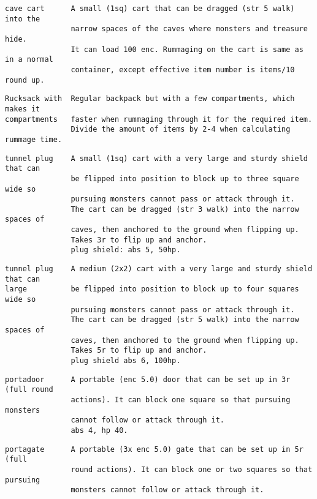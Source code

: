 \small \begin{samepage} \begin{verbatim}
cave cart      A small (1sq) cart that can be dragged (str 5 walk) into the
               narrow spaces of the caves where monsters and treasure hide.
               It can load 100 enc. Rummaging on the cart is same as in a normal
               container, except effective item number is items/10 round up.
\end{verbatim} \blocklistgap \begin{verbatim}
Rucksack with  Regular backpack but with a few compartments, which makes it
compartments   faster when rummaging through it for the required item.
               Divide the amount of items by 2-4 when calculating rummage time.
\end{verbatim} \blocklistgap \begin{verbatim}
tunnel plug    A small (1sq) cart with a very large and sturdy shield that can
               be flipped into position to block up to three square wide so
               pursuing monsters cannot pass or attack through it.
               The cart can be dragged (str 3 walk) into the narrow spaces of
               caves, then anchored to the ground when flipping up.
               Takes 3r to flip up and anchor.
               plug shield: abs 5, 50hp.
\end{verbatim} \blocklistgap \begin{verbatim}
tunnel plug    A medium (2x2) cart with a very large and sturdy shield that can
large          be flipped into position to block up to four squares wide so
               pursuing monsters cannot pass or attack through it.
               The cart can be dragged (str 5 walk) into the narrow spaces of
               caves, then anchored to the ground when flipping up.
               Takes 5r to flip up and anchor.
               plug shield abs 6, 100hp.
\end{verbatim} \blocklistgap \begin{verbatim}
portadoor      A portable (enc 5.0) door that can be set up in 3r (full round
               actions). It can block one square so that pursuing monsters
               cannot follow or attack through it.
               abs 4, hp 40.
\end{verbatim} \blocklistgap \begin{verbatim}
portagate      A portable (3x enc 5.0) gate that can be set up in 5r (full
               round actions). It can block one or two squares so that pursuing
               monsters cannot follow or attack through it.

\end{verbatim}
\end{samepage}
